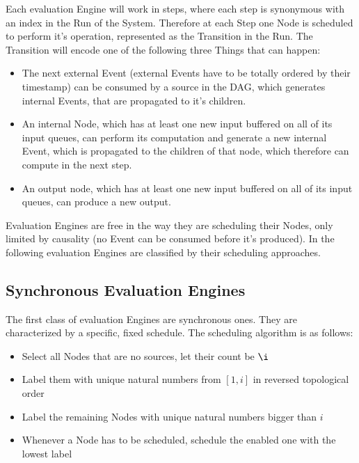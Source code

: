 Each evaluation Engine will work in steps, where each step is synonymous with an index in the Run of the System.
Therefore at each Step one Node is scheduled to perform it's operation, represented as the Transition in the Run.
The Transition will encode one of the following three Things that can happen:

\begin{itemize}
  \item The next external Event (external Events have to be totally ordered by their timestamp) can be consumed by a source in the DAG, which generates internal Events, that are propagated to it's children.
  \item An internal Node, which has at least one new input buffered on all of its input queues, can perform
    its computation and generate a new internal Event, which is propagated to the children of that node, which therefore can compute in the next step.
  \item An output node, which has at least one new input buffered on all of its input queues, can produce a new output.
\end{itemize}

Evaluation Engines are free in the way they are scheduling their Nodes, only limited by causality (no Event can be consumed before it's produced).
In the following evaluation Engines are classified by their scheduling approaches.

\subsection{Synchronous Evaluation Engines}
\label{sec:concepts:behaviour_without_timing:synchronous}

The first class of evaluation Engines are synchronous ones.
They are characterized by a specific, fixed schedule.
The scheduling algorithm is as follows:

\begin{itemize}
  \item Select all Nodes that are no sources, let their count be \(\i\)
  \item Label them with unique natural numbers from \([1,i]\) in reversed topological order
  \item Label the remaining Nodes with unique natural numbers bigger than \(i\)
  \item Whenever a Node has to be scheduled, schedule the enabled one with the lowest label
\end{itemize}

